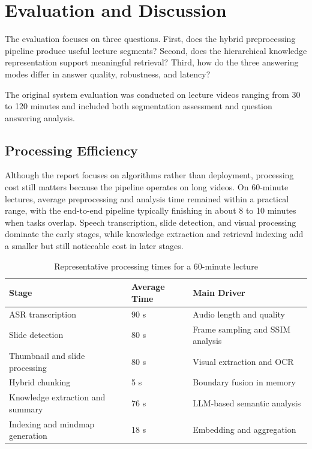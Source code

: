 \section{Evaluation and Discussion}

The evaluation focuses on three questions. First, does the hybrid preprocessing pipeline produce useful lecture segments? Second, does the hierarchical knowledge representation support meaningful retrieval? Third, how do the three answering modes differ in answer quality, robustness, and latency?

The original system evaluation was conducted on lecture videos ranging from 30 to 120 minutes and included both segmentation assessment and question answering analysis.

\subsection{Processing Efficiency}

Although the report focuses on algorithms rather than deployment, processing cost still matters because the pipeline operates on long videos. On 60-minute lectures, average preprocessing and analysis time remained within a practical range, with the end-to-end pipeline typically finishing in about 8 to 10 minutes when tasks overlap. Speech transcription, slide detection, and visual processing dominate the early stages, while knowledge extraction and retrieval indexing add a smaller but still noticeable cost in later stages.

\begin{table}[H]
    \centering
    \caption{Representative processing times for a 60-minute lecture}
    \begin{tabular}{@{}lll@{}}
        \toprule
        \textbf{Stage} & \textbf{Average Time} & \textbf{Main Driver} \\ \midrule
        ASR transcription & 90 s & Audio length and quality \\
        Slide detection & 80 s & Frame sampling and SSIM analysis \\
        Thumbnail and slide processing & 80 s & Visual extraction and OCR \\
        Hybrid chunking & 5 s & Boundary fusion in memory \\
        Knowledge extraction and summary & 76 s & LLM-based semantic analysis \\
        Indexing and mindmap generation & 18 s & Embedding and aggregation \\ \bottomrule
    \end{tabular}
\end{table}


